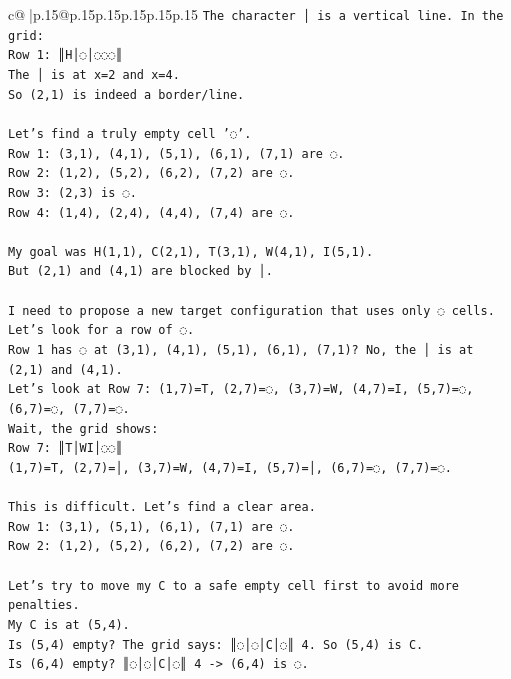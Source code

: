 \documentclass{article}
\begin{document}
{\begin{supertabular}{c@{$\;$}|p{.15\linewidth}@{}p{.15\linewidth}p{.15\linewidth}p{.15\linewidth}p{.15\linewidth}p{.15\linewidth}}
{{{\texttt{The character │ is a vertical line. In the grid:} \\
\texttt{Row 1: ║H│◌│◌◌◌║} \\
\texttt{The │ is at x=2 and x=4.} \\
\texttt{So (2,1) is indeed a border/line.} \\
\\ 
\texttt{Let's find a truly empty cell '◌'.} \\
\texttt{Row 1: (3,1), (4,1), (5,1), (6,1), (7,1) are ◌.} \\
\texttt{Row 2: (1,2), (5,2), (6,2), (7,2) are ◌.} \\
\texttt{Row 3: (2,3) is ◌.} \\
\texttt{Row 4: (1,4), (2,4), (4,4), (7,4) are ◌.} \\
\\ 
\texttt{My goal was H(1,1), C(2,1), T(3,1), W(4,1), I(5,1).} \\
\texttt{But (2,1) and (4,1) are blocked by │.} \\
\\ 
\texttt{I need to propose a new target configuration that uses only ◌ cells.} \\
\texttt{Let's look for a row of ◌.} \\
\texttt{Row 1 has ◌ at (3,1), (4,1), (5,1), (6,1), (7,1)? No, the │ is at (2,1) and (4,1).} \\
\texttt{Let's look at Row 7: (1,7)=T, (2,7)=◌, (3,7)=W, (4,7)=I, (5,7)=◌, (6,7)=◌, (7,7)=◌.} \\
\texttt{Wait, the grid shows:} \\
\texttt{Row 7: ║T│WI│◌◌║} \\
\texttt{(1,7)=T, (2,7)=│, (3,7)=W, (4,7)=I, (5,7)=│, (6,7)=◌, (7,7)=◌.} \\
\\ 
\texttt{This is difficult. Let's find a clear area.} \\
\texttt{Row 1: (3,1), (5,1), (6,1), (7,1) are ◌.} \\
\texttt{Row 2: (1,2), (5,2), (6,2), (7,2) are ◌.} \\
\\ 
\texttt{Let's try to move my C to a safe empty cell first to avoid more penalties.} \\
\texttt{My C is at (5,4).} \\
\texttt{Is (5,4) empty? The grid says: ║◌│◌│C│◌║ 4. So (5,4) is C.} \\
\texttt{Is (6,4) empty? ║◌│◌│C│◌║ 4 {-}> (6,4) is ◌.} \\
}}}
\end{supertabular}}
\end{document}
